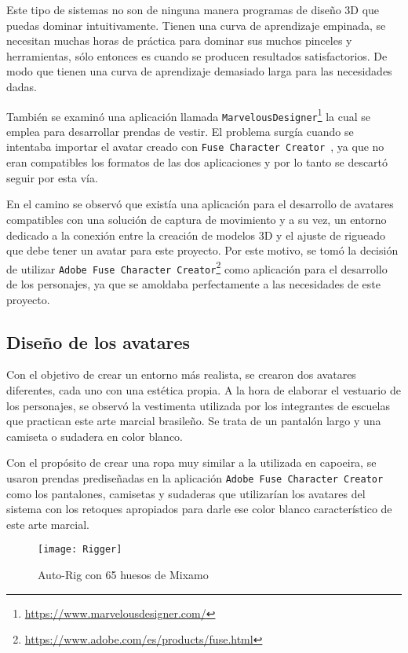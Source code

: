 Este tipo de sistemas no son de ninguna manera programas de diseño 3D que puedas dominar intuitivamente. Tienen una curva de aprendizaje empinada, se necesitan muchas horas de práctica para dominar sus muchos pinceles y herramientas, sólo entonces es cuando se producen resultados satisfactorios. De modo que tienen una curva de aprendizaje demasiado larga para las necesidades dadas. 

También se examinó una aplicación llamada \texttt{MarvelousDesigner}\footnote{\url{https://www.marvelousdesigner.com/}} la cual se emplea para desarrollar prendas de vestir. El problema surgía cuando se intentaba importar el avatar creado con \texttt{Fuse Character Creator }, ya que no eran compatibles los formatos de las dos aplicaciones y por lo tanto se descartó seguir por esta vía. 

En el camino se observó que existía una aplicación para el desarrollo de avatares compatibles con una solución de captura de movimiento y a su vez, un entorno dedicado a la conexión entre la creación de modelos 3D y el ajuste de rigueado que debe tener un avatar para este proyecto. Por este motivo, se tomó la decisión de utilizar \texttt{Adobe Fuse Character Creator}\footnote{\url{https://www.adobe.com/es/products/fuse.html}} como aplicación para el desarrollo de los personajes, ya que se amoldaba perfectamente a las necesidades de este proyecto.

\subsection{Diseño de los avatares}

Con el objetivo de crear un entorno más realista, se crearon dos avatares diferentes, cada uno con una estética propia. A la hora de elaborar el vestuario de los personajes, se observó la vestimenta utilizada por los integrantes de escuelas que practican este arte marcial brasileño. Se trata de un pantalón largo y una camiseta o sudadera en color blanco. 

Con el propósito de crear una ropa muy similar a la utilizada en capoeira, se usaron prendas prediseñadas en la aplicación \texttt{Adobe Fuse Character Creator} como los pantalones, camisetas y sudaderas que utilizarían los avatares del sistema con los retoques apropiados para darle ese color blanco característico de este arte marcial.

\begin{figure}[h!]
    \centering 
    \texttt{[image: Rigger]}
    \caption{Auto-Rig con 65 huesos de Mixamo}
    \label{fig:Rigger}
\end{figure} 

